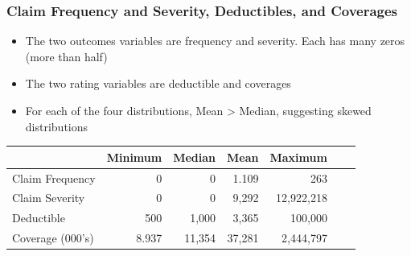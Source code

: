 \documentclass[serif,10pt]{beamer}
\begin{document}
\begin{frame}
\frametitle{Claim Frequency and Severity, Deductibles, and Coverages}
  \begin{itemize}
\item The two outcomes variables are frequency and severity. Each has many zeros (more than
half) \vspace{2mm}
\item The two rating variables are deductible and coverages \vspace{2mm}
\item For each of the four distributions, Mean > Median, suggesting skewed
distributions \vspace{2mm}
\end{itemize}
\begin{table}[htp]
\begin{center}
\begin{tabular}{l|rrrrrr} \hline
                 &   Minimum  &   Median   &   Mean &   Maximum \\ \hline
Claim Frequency  &          0 &          0 &   1.109 &        263      \\
Claim Severity   &          0 &          0 &   9,292 &   12,922,218  \\
Deductible       &        500 &      1,000 &   3,365 &   100,000 \\
Coverage (000's) &      8.937 &     11,354 &   37,281 &    2,444,797 \\
\hline
\end{tabular}
\end{center}
\end{table}
\end{frame}
\end{document}
